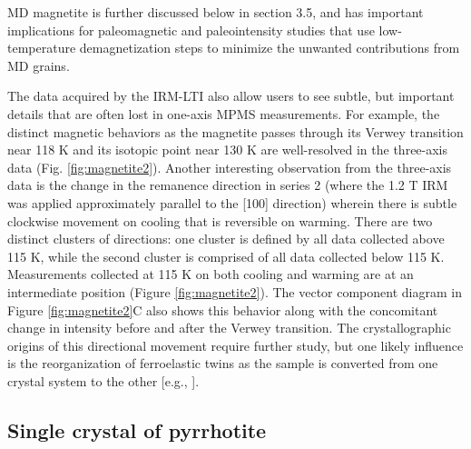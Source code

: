 \documentclass[draft,gc]{AGUTeX}
\begin{document}
\begin{article}
MD magnetite is further discussed below in section 3.5, and has important implications for paleomagnetic and paleointensity studies that use low-temperature demagnetization steps to minimize the unwanted contributions from MD grains. 

The data acquired by the IRM-LTI also allow users to see subtle, but important details that are often lost in one-axis MPMS measurements.  For example, the distinct magnetic behaviors as the magnetite passes through its Verwey transition near 118 K and its isotopic point near 130 K are well-resolved in the three-axis data (Fig. \ref{fig:magnetite2}). Another interesting observation from the three-axis data is the change in the remanence direction in series 2 (where the 1.2 T  IRM was applied approximately parallel to the [100] direction) wherein there is subtle clockwise movement on cooling that is reversible on warming.  There are two distinct clusters of directions: one cluster is defined by all data collected above 115 K, while the second cluster is comprised of all data collected below 115 K.  Measurements collected at 115 K on both cooling and warming are at an intermediate position (Figure \ref{fig:magnetite2}). The vector component diagram in Figure \ref{fig:magnetite2}C also shows this behavior along with the concomitant change in intensity before and after the Verwey transition. The crystallographic origins of this directional movement require further study, but one likely influence is the reorganization of ferroelastic twins as the sample is converted from one crystal system to the other [e.g., \cite{Kasama2010a}].         

\subsection{Single crystal of pyrrhotite}


\end{article}
\end{document}
